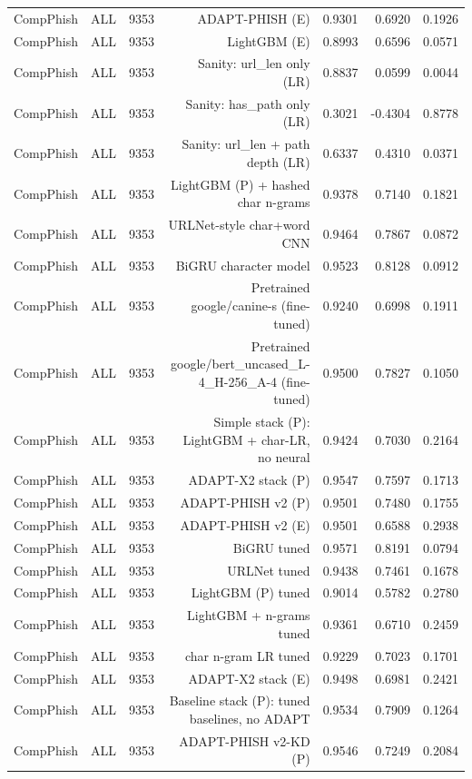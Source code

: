 \begin{table}[t]
\begin{tabular}{llrrrrr}
CompPhish & ALL & 9353 & ADAPT-PHISH (E) & 0.9301 & 0.6920 & 0.1926 \\
CompPhish & ALL & 9353 & LightGBM (E) & 0.8993 & 0.6596 & 0.0571 \\
CompPhish & ALL & 9353 & Sanity: url\_len only (LR) & 0.8837 & 0.0599 & 0.0044 \\
CompPhish & ALL & 9353 & Sanity: has\_path only (LR) & 0.3021 & -0.4304 & 0.8778 \\
CompPhish & ALL & 9353 & Sanity: url\_len + path depth (LR) & 0.6337 & 0.4310 & 0.0371 \\
CompPhish & ALL & 9353 & LightGBM (P) + hashed char n-grams & 0.9378 & 0.7140 & 0.1821 \\
CompPhish & ALL & 9353 & URLNet-style char+word CNN & 0.9464 & 0.7867 & 0.0872 \\
CompPhish & ALL & 9353 & BiGRU character model & 0.9523 & 0.8128 & 0.0912 \\
CompPhish & ALL & 9353 & Pretrained google/canine-s (fine-tuned) & 0.9240 & 0.6998 & 0.1911 \\
CompPhish & ALL & 9353 & Pretrained google/bert\_uncased\_L-4\_H-256\_A-4 (fine-tuned) & 0.9500 & 0.7827 & 0.1050 \\
CompPhish & ALL & 9353 & Simple stack (P): LightGBM + char-LR, no neural & 0.9424 & 0.7030 & 0.2164 \\
CompPhish & ALL & 9353 & ADAPT-X2 stack (P) & 0.9547 & 0.7597 & 0.1713 \\
CompPhish & ALL & 9353 & ADAPT-PHISH v2 (P) & 0.9501 & 0.7480 & 0.1755 \\
CompPhish & ALL & 9353 & ADAPT-PHISH v2 (E) & 0.9501 & 0.6588 & 0.2938 \\
CompPhish & ALL & 9353 & BiGRU tuned & 0.9571 & 0.8191 & 0.0794 \\
CompPhish & ALL & 9353 & URLNet tuned & 0.9438 & 0.7461 & 0.1678 \\
CompPhish & ALL & 9353 & LightGBM (P) tuned & 0.9014 & 0.5782 & 0.2780 \\
CompPhish & ALL & 9353 & LightGBM + n-grams tuned & 0.9361 & 0.6710 & 0.2459 \\
CompPhish & ALL & 9353 & char n-gram LR tuned & 0.9229 & 0.7023 & 0.1701 \\
CompPhish & ALL & 9353 & ADAPT-X2 stack (E) & 0.9498 & 0.6981 & 0.2421 \\
CompPhish & ALL & 9353 & Baseline stack (P): tuned baselines, no ADAPT & 0.9534 & 0.7909 & 0.1264 \\
CompPhish & ALL & 9353 & ADAPT-PHISH v2-KD (P) & 0.9546 & 0.7249 & 0.2084 \\

\end{tabular}
\end{table}

